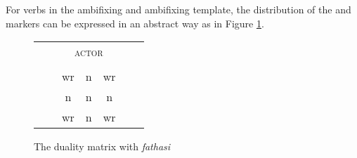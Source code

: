 For verbs in the  ambifixing and  ambifixing template, the distribution of the  and  markers can be expressed in an abstract way as in Figure \ref{dualitymatrixfathasi}.
\vspace{-.1cm}
\begin{figure}

	\begin{tabular}{|ccccccc|}
		\cline{3-5}
		\multicolumn{2}{c|}{}&\multicolumn{3}{c|}{\textsc{actor}}&\\\cline{3-5}
		\multicolumn{2}{c|}{}&\multicolumn{1}{c}{\Sg}&\multicolumn{1}{|c|}{\Du}&\multicolumn{1}{c|}{\Pl}&\\\cline{1-5}
		{\parbox[t]{2mm}{}}&\multicolumn{1}{|c|}{\parbox[t]{2mm}{}}&\multicolumn{1}{c}{\multirow{2}{*}{\hspace{0,1cm}wr\hspace{0,1cm}}}	&\multirow{2}{*}{\hspace{0,1cm}n\hspace{0,1cm}}	&\multicolumn{1}{c|}{\multirow{2}{*}{\hspace{0,1cm}wr\hspace{0,1cm}}}&\\
		&\multicolumn{1}{|c|}{}&&&\multicolumn{1}{c|}{}\\\cline{2-2}
		&\multicolumn{1}{|c|}{\parbox[t]{2mm}{}}&\multicolumn{1}{c}{\multirow{2}{*}{\hspace{0,1cm}n\hspace{0,1cm}}}&\multirow{2}{*}{\hspace{0,1cm}n\hspace{0,1cm}}&\multicolumn{1}{c|}{\multirow{2}{*}{\hspace{0,1cm}n\hspace{0,1cm}}}&\\
		&\multicolumn{1}{|c|}{}&&&\multicolumn{1}{c|}{}\\\cline{2-2}
		&\multicolumn{1}{|c|}{\parbox[t]{2mm}{}}&\multicolumn{1}{c}{\multirow{2}{*}{\hspace{0,1cm}wr\hspace{0,1cm}}}&\multirow{2}{*}{\hspace{0,1cm}n\hspace{0,1cm}}&\multicolumn{1}{c|}{\multirow{2}{*}{\hspace{0,1cm}wr\hspace{0,1cm}}}&\\
		&\multicolumn{1}{|c|}{}&&&\multicolumn{1}{c|}{}\\\cline{1-5}
	\end{tabular}
\caption{The duality matrix with \emph{fathasi}}
\label{dualitymatrixfathasi}
\end{figure}%


